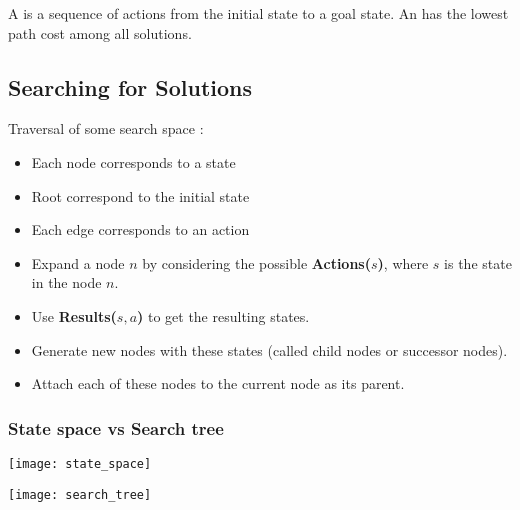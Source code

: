A  is a sequence of actions from the initial state to a goal state.
An  has the lowest path cost among all solutions.

\subsection{Searching for Solutions}

Traversal of some search space :
\begin{itemize}
\item Each node corresponds to a state
\item Root correspond to the initial state
\item Each edge corresponds to an action
\end{itemize}

\begin{itemize}
\item Expand a node $n$ by considering the possible \textbf{Actions($s$)}, where $s$ is the state in the node $n$.
\item Use \textbf{Results($s, a$)} to get the resulting states.
\item Generate new nodes with these states (called child nodes or successor nodes).
\item Attach each of these nodes to the current node as its parent.
\end{itemize}

\subsubsection{State space vs Search tree}

\begin{Parallel}[v]{0.48\textwidth}{0.48\textwidth}
\ParallelPar
\end{Parallel}

\begin{minipage}{0.48\textwidth}
  \centering
  \texttt{[image: state\_space]}
\end{minipage}
\begin{minipage}{0.48\textwidth}
  \centering
  \texttt{[image: search\_tree]}
\end{minipage}


